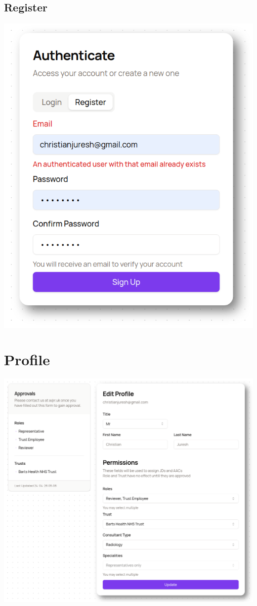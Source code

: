 \begin{appendices}
\begin{center}
\subsection{Register}
\includegraphics[width=0.35\textheight]{images/register.png}
\end{center}

\section{Profile} \label{app:Profile}
\includegraphics[width=\textwidth]{images/profile.png}


\end{appendices}
